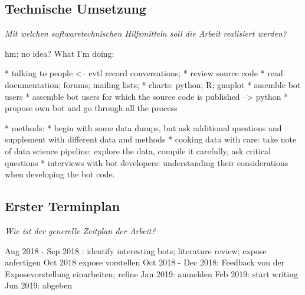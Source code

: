 \documentclass[pdftex,a4paper,11pt]{scrartcl}
\begin{document}
\subsection{Technische Umsetzung}
\noindent \emph{Mit welchen softwaretechnischen Hilfsmitteln soll die Arbeit realisiert werden?}
\begin{comment}
\begin{itemize}
	\item Selbstverständlich können Sie an der Stelle noch nicht alles wissen, aber Sie sollen sich hier bereits einen guten Überblick verschaffen.
\end{itemize}
\end{comment}

hm; no idea?
What I'm doing:

* talking to people <-- evtl record conversations;
* review source code
* read documentation; forums; mailing lists;
* charts: python; R; gnuplot
* assemble bot users
* assemble bot users for which the source code is published
--> python
* propose own bot and go through all the process

* methods:
  * begin with some data dumps, but ask additional questions and supplement with different data and methods
  * cooking data with care: take note of data science pipeline: explore the data, compile it carefully, ask critical questions
  * interviews with bot developers: understanding their considerations when developing the bot code.
\subsection{Erster Terminplan}
\noindent  \emph{Wie ist der generelle Zeitplan der Arbeit? }

Aug 2018 - Sep 2018 : identify interesting bots; literature review; expose anfertigen
Oct 2018 expose vorstellen
Oct 2018 - Dec 2018: Feedback von der Exposevorstellung einarbeiten; refine
Jan 2019: anmelden
Feb 2019: start writing
Jun 2019: abgeben

\begin{comment}
\begin{itemize}
	\item Sie sollten bereits wissen, wann Sie fertig sein wollen und von dort mit der Rückwärtsterminierung starten.
	\item Ihre Arbeit ist ein Projekt, daher planen Sie es auch wie eines. Nutzen Sie zur Visualisierung ein Gantt-Chart.
\end{itemize}
\end{comment}
\end{document}
